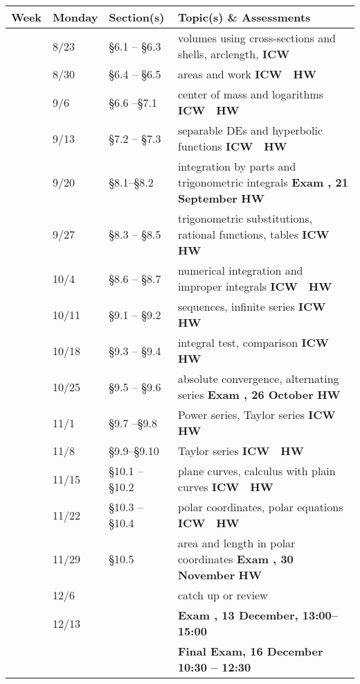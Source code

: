 \documentclass[12pt]{article}
\newcounter{qz}\setcounter{qz}{0}
\newcommand{\qz}{%
\setcounter{qz}{\value{qz}+1}
\textbf{ICW  \theqz} \,\,}
\newcounter{hw}\setcounter{hw}{0}
\newcommand{\hw}{%
\setcounter{hw}{\value{hw}+1}
\textbf{HW \thehw} \,\,}
\newcounter{ex}\setcounter{ex}{0}
\newcommand{\ex}{%
\setcounter{ex}{\value{ex}+1}
Exam \theex}
\newcounter{wk}\setcounter{wk}{0}
\newcommand{\wk}{%
\setcounter{wk}{\value{wk}+1}
\thewk \,\,}
\begin{document}
\begin{center}

    \small
\begin{tabular}  {|l|l|l|l|}
\hline
{\bf Week}  & \textbf{Monday} &  {\bf Section(s)} & {\bf Topic(s) \& Assessments} \\
\hline \hline 
\wk    & 8/23 &    \S6.1 -- \S6.3   & volumes using cross-sections and shells, arclength, \hfill \qz  \\
\wk    & 8/30  &  \S6.4 -- \S6.5   &  areas and work  \hfill \qz \hw  \\
\wk    & 9/6 &     \S6.6 --\S7.1  &  center of mass and logarithms \hfill \qz \hw \\
\wk    & 9/13  &     \S7.2 -- \S7.3  & separable DEs   and hyperbolic functions  \hfill \qz \hw            \\
\wk    & 9/20 &  \S8.1--\S8.2    &  integration by parts and trigonometric integrals    \hfill \textbf{\ex\-\-, 21 September} \hw \\ \hline
\wk    & 9/27   & \S8.3 -- \S8.5   & trigonometric substitutions, rational functions, tables  \hfill \qz \hw  \\
\wk    & 10/4     & \S8.6 -- \S8.7  & numerical integration and improper integrals  \hfill \qz \hw  \\
\wk   & 10/11   & \S9.1 -- \S9.2  &   sequences, infinite series  \hfill \qz \hw  \\
\wk  &  10/18   & \S9.3 -- \S9.4 &  integral test, comparison   \hfill \qz  \hw \\ 
\wk &  10/25     &   \S9.5 -- \S9.6 &  absolute convergence, alternating series \hfill  \textbf{ \ex, 26 October} \hw \\ \hline
\wk  & 11/1  &   \S9.7 --\S9.8 & Power series, Taylor series \hfill \qz  \hw  \\
\wk   & 11/8  & \S9.9--\S9.10  &  Taylor series \hfill \qz \hw \\
\wk   & 11/15& \S10.1  -- \S10.2   & plane curves, calculus with plain curves   \hfill \qz \hw  \\
\wk   & 11/22   &  \S10.3 -- \S10.4   & polar coordinates, polar equations  \hfill \qz \hw  \\
\wk   & 11/29    &  \S10.5     &  area and length in polar coordinates  \hfill \textbf{ \ex, 30 November }  \hw \\ \hline
\wk   & 12/6      &         &  catch up or review  \\  
\wk   & 12/13      &  &     \hfill \textbf{\ex,  13 December, 13:00--15:00} \\ 
         &               & &   \hfill  \textbf{ Final Exam, 16 December  10:30 -- 12:30} \\ \hline
\end{tabular}
\end{center}
\end{document}
